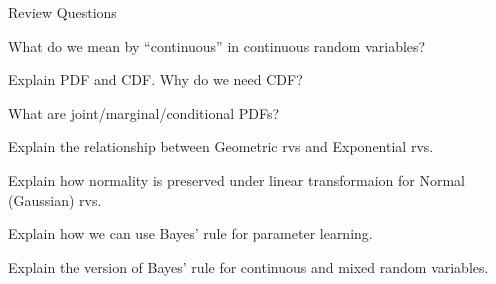 \begin{frame}{Review Questions}


\plitemsep 0.1in

\bce[1)]
\item What do we mean by ``continuous'' in continuous random variables?

\item Explain PDF  and CDF. Why do we need CDF?

\item What are joint/marginal/conditional PDFs?

\item Explain the relationship between Geometric rvs and Exponential
  rvs. 

\item Explain how normality is preserved under linear transformaion
  for Normal (Gaussian) rvs. 
  
\item Explain how we can use Bayes' rule for parameter learning. 

\item Explain the version of Bayes' rule for continuous
  and mixed random variables.


\ece

\end{frame}


